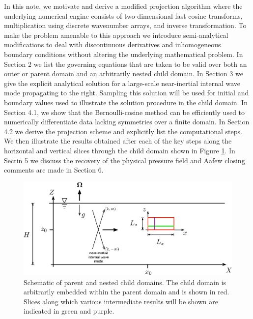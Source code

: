 \documentclass{jfm-like}
\begin{document}
In this note, we motivate and derive a modified projection algorithm where the underlying numerical engine consists of two-dimensional fast cosine transforms, multiplication using discrete wavenumber arrays, and inverse
transformation. To make the problem amenable to this approach we introduce  semi-analytical modifications to deal with discontinuous derivatives and inhomogeneous boundary conditions without altering the underlying
mathematical problem. In Section 2 we list the governing equations that are taken to be valid over both an outer or parent domain and an arbitrarily nested child domain. In Section 3 we give the explicit analytical
solution for a large-scale near-inertial internal wave mode propagating to the right. Sampling this solution will be used for initial and boundary values used to illustrate the solution procedure in the child domain.
In Section 4.1, we show that the Bernoulli-cosine method can be efficiently used to numerically differentiate data lacking symmetries over a finite domain. In Section 4.2 we derive the projection scheme and explicitly list
the computational steps. We then illustrate the results obtained after each of the key steps along the horizontal and vertical slices through the child domain shown in Figure \ref{fig:schematic}.
In Sectin 5 we discuss the recovery of the physical pressure field and
Aafew closing comments are made in Section 6.
 \begin{figure}
  \centerline{\includegraphics[width=1.0\textwidth]{FIGS/schematic.eps}}
  \caption{Schematic of parent and nested child domains. The child domain is arbitrarily embedded within the parent domain and is shown in red. Slices along which various intermediate results will be shown are indicated in green and purple.} 
  \label{fig:schematic}
\end{figure}
\end{document}
